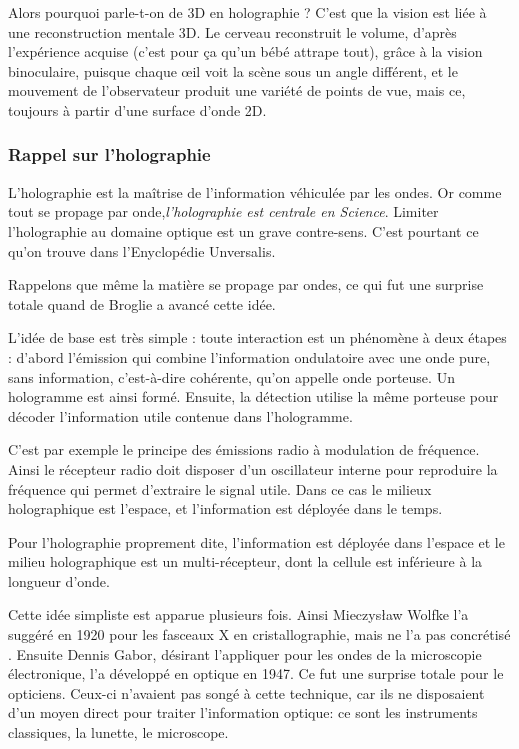 \documentclass[a4paper,12pt]{article}
\begin{document}
Alors pourquoi parle-t-on de 3D en holographie ? C'est que la vision est liée à une reconstruction mentale 3D. Le cerveau reconstruit le volume, d'après l'expérience acquise (c'est pour ça qu'un bébé attrape tout), grâce à la vision binoculaire, puisque chaque œil voit la scène sous un angle différent, et le mouvement de l'observateur produit une variété de points de vue, mais ce, toujours à partir d'une surface d'onde 2D.



\subsubsection{Rappel sur l'holographie}

L'holographie est la ma\^itrise de l'information véhiculée par les ondes. Or comme tout se propage par onde,\textit {l'holographie est centrale en Science}. Limiter l'holographie au domaine optique est un grave contre-sens. C'est pourtant ce qu'on trouve dans l'Enyclopédie Unversalis. 



Rappelons que même la matière se propage par ondes, ce qui fut une surprise totale quand de Broglie a avancé cette idée. 



L'idée de base est très simple : toute interaction est un phénomène à deux étapes : d'abord l'émission qui combine l'information ondulatoire avec une onde pure, sans information, c'est-à-dire cohérente, qu'on appelle onde porteuse. Un hologramme est ainsi formé. Ensuite, la détection utilise la même porteuse pour décoder l'information utile contenue dans l'hologramme.


C'est par exemple le principe des émissions radio à modulation de fréquence. Ainsi le récepteur radio doit disposer d'un oscillateur interne pour reproduire la fréquence qui permet d'extraire le signal utile. Dans ce cas le milieux holographique est l'espace, et l'information est déployée dans le temps.


Pour l'holographie proprement dite, l'information est déployée dans l'espace et le milieu holographique est un multi-récepteur, dont la cellule est inférieure à la longueur d'onde.


Cette idée simpliste est apparue plusieurs fois. Ainsi Mieczysław Wolfke l'a suggéré en 1920 pour les fasceaux X en cristallographie, mais ne l'a pas concrétisé \cite{Gabor}. Ensuite Dennis Gabor, désirant l'appliquer pour les ondes de la microscopie électronique, l'a développé en optique en 1947. Ce fut une surprise totale pour le opticiens. Ceux-ci n'avaient pas songé à cette technique, car ils ne disposaient d'un moyen direct pour traiter l'information optique: ce sont les instruments classiques, la lunette, le microscope.
\end{document}
